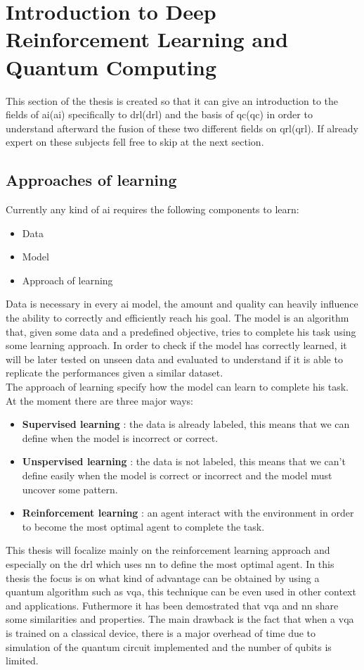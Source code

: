 \section{Introduction to Deep Reinforcement Learning and Quantum Computing}
This section of the thesis is created so that it can give an introduction to the fields of \acrlong{ai}(\acrshort{ai}) specifically to \acrlong{drl}(\acrshort{drl}) and the basis of \acrlong{qc}(\acrshort{qc}) in order to understand afterward the fusion of these two different fields on \acrlong{qrl}(\acrshort{qrl}). If already expert on these subjects fell free to skip at the next section.
\subsection{Approaches of learning}
Currently any kind of \acrshort{ai} requires the following components to learn:
\begin{itemize}
	\item Data
	\item Model
	\item Approach of learning
\end{itemize}
Data is necessary in every \acrshort{ai} model, the amount and quality can heavily influence the ability to correctly and efficiently reach his goal. 
The model is an algorithm that, given some data and a predefined objective, tries to complete his task using some learning approach. In order to check if the model has correctly learned, it will be later tested on unseen data and evaluated to understand if it is able to replicate the performances given a similar dataset.\\
The approach of learning specify how the model can learn to complete his task. At the moment there are three major ways:
\begin{itemize}
	\item \textbf{Supervised learning} : the data is already labeled, this means that we can define when the model is incorrect or correct.
	\item \textbf{Unspervised learning} : the data is not labeled, this means that we can't define easily when the model is correct or incorrect and the model must uncover some pattern.
	\item \textbf{Reinforcement learning} : an agent interact with the environment in order to become the most optimal agent to complete the task.
\end{itemize}
This thesis will focalize mainly on the reinforcement learning approach and especially on the \acrfull{drl} which uses \acrfull{nn} to define the most optimal agent.
In this thesis the focus is on what kind of advantage can be obtained by using a quantum algorithm such as \acrfull{vqa}, this technique can be even used in other context and applications. Futhermore it has been demostrated that \acrshort{vqa} and \acrshort{nn} share some similarities and properties. The main drawback is the fact that when a \acrshort{vqa} is trained on a classical device, there is a major overhead of time due to simulation of the quantum circuit implemented and the number of qubits is limited.
\newpage
